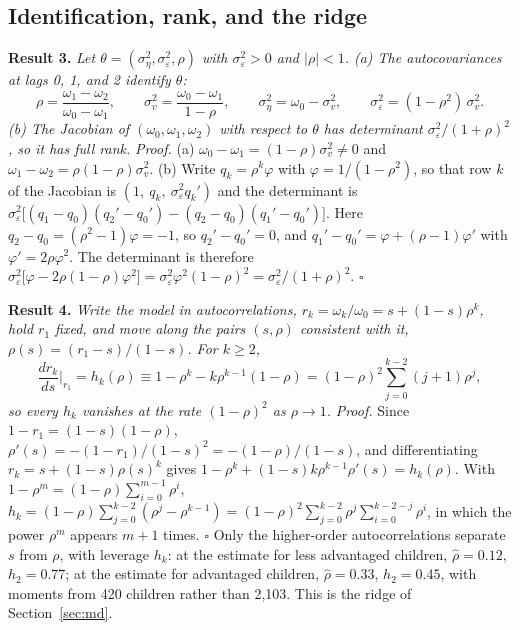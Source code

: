 \documentclass[11pt]{article}
\begin{document}
\subsection{Identification, rank, and the ridge}
\label{app:ridge}

\noindent\textbf{Result 3.} \emph{Let $\theta = (\sigma^2_\eta, \sigma^2_\varepsilon, \rho)$ with $\sigma^2_\varepsilon > 0$ and $|\rho| < 1$. (a) The autocovariances at lags 0, 1, and 2 identify $\theta$:}
\begin{equation}
\rho = \frac{\omega_1 - \omega_2}{\omega_0 - \omega_1}, \qquad
\sigma^2_v = \frac{\omega_0 - \omega_1}{1-\rho}, \qquad
\sigma^2_\eta = \omega_0 - \sigma^2_v, \qquad \sigma^2_\varepsilon = (1-\rho^2)\,\sigma^2_v .
\label{eq:app-ident}
\end{equation}
\noindent\emph{(b) The Jacobian of $(\omega_0, \omega_1, \omega_2)$ with respect to $\theta$ has determinant $\sigma^2_\varepsilon/(1+\rho)^2$, so it has full rank.}
\proofskip
\noindent\emph{Proof.} (a) $\omega_0 - \omega_1 = (1-\rho)\sigma^2_v \ne 0$ and $\omega_1 - \omega_2 = \rho(1-\rho)\sigma^2_v$. (b) Write $q_k = \rho^k \varphi$ with $\varphi = 1/(1-\rho^2)$, so that row $k$ of the Jacobian is $(1,\ q_k,\ \sigma^2_\varepsilon q_k')$ and the determinant is $\sigma^2_\varepsilon\big[(q_1 - q_0)(q_2' - q_0') - (q_2 - q_0)(q_1' - q_0')\big]$. Here $q_2 - q_0 = (\rho^2 - 1)\varphi = -1$, so $q_2' - q_0' = 0$, and $q_1' - q_0' = \varphi + (\rho - 1)\varphi'$ with $\varphi' = 2\rho \varphi^2$. The determinant is therefore $\sigma^2_\varepsilon\big[\varphi - 2\rho(1-\rho)\varphi^2\big] = \sigma^2_\varepsilon \varphi^2(1-\rho)^2 = \sigma^2_\varepsilon/(1+\rho)^2$. \hfill$\square$

\resultskip
\noindent\textbf{Result 4.} \emph{Write the model in autocorrelations, $r_k = \omega_k/\omega_0 = s + (1-s)\rho^{k}$, hold $r_1$ fixed, and move along the pairs $(s, \rho)$ consistent with it, $\rho(s) = (r_1 - s)/(1-s)$. For $k \ge 2$,}
\begin{equation}
\frac{d r_k}{d s}\Big|_{r_1} = h_k(\rho) \equiv 1 - \rho^{k} - k\rho^{k-1}(1-\rho)
= (1-\rho)^2\sum_{j=0}^{k-2}(j+1)\rho^{j},
\label{eq:app-hk}
\end{equation}
\emph{so every $h_k$ vanishes at the rate $(1-\rho)^2$ as $\rho \to 1$.}
\proofskip
\noindent\emph{Proof.} Since $1 - r_1 = (1-s)(1-\rho)$, $\rho'(s) = -(1-r_1)/(1-s)^2 = -(1-\rho)/(1-s)$, and differentiating $r_k = s + (1-s)\rho(s)^k$ gives $1 - \rho^{k} + (1-s)k\rho^{k-1}\rho'(s) = h_k(\rho)$. With $1 - \rho^m = (1-\rho)\sum_{i=0}^{m-1}\rho^i$, $h_k = (1-\rho)\sum_{j=0}^{k-2}(\rho^j - \rho^{k-1}) = (1-\rho)^2\sum_{j=0}^{k-2}\rho^j\sum_{i=0}^{k-2-j}\rho^i$, in which the power $\rho^m$ appears $m+1$ times. \hfill$\square$
\partskip
Only the higher-order autocorrelations separate $s$ from $\rho$, with leverage $h_k$: at the estimate for less advantaged children, $\hat\rho = 0.12$, $h_2 = 0.77$; at the estimate for advantaged children, $\hat\rho = 0.33$, $h_2 = 0.45$, with moments from 420 children rather than 2,103. This is the ridge of Section~\ref{sec:md}.
\end{document}
